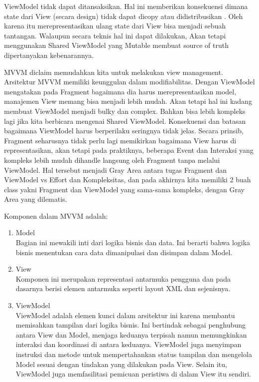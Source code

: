 \documentclass[conference]{IEEEtran}
\begin{document}
\indent ViewModel tidak dapat ditansaksikan. Hal ini memberikan konsekuensi dimana state dari View (secara design) tidak dapat dicopy atau didistribusikan \cite{saputro2020implementasi}. Oleh karena itu merepresentasikan ulang state dari View bisa menjadi sebuah tantangan. Walaupun secara teknis hal ini dapat dilakukan, Akan tetapi menggunakan Shared ViewModel yang Mutable membuat source of truth dipertanyakan kebenarannya.

\indent MVVM diclaim memudahkan kita untuk melakukan view management. Arsitektur MVVM memiliki keunggulan dalam modifiabilitas\cite{anhar2024analisis}. Dengan ViewModel mengatakan pada Fragment bagaimana dia harus merepresentasikan model, manajemen View memang bisa menjadi lebih mudah. Akan tetapi hal ini kadang membuat ViewModel menjadi bulky dan complex. Bahkan bisa lebih kompleks lagi jika kita berbicara mengenai Shared ViewModel. Konsekuensi dan batasan bagaimana ViewModel harus berperilaku seringnya tidak jelas. Secara prinsib, Fragment seharusnya tidak perlu lagi memikirkan bagaimana View harus di representasikan, akan tetapi pada praktiknya, beberapa Event dan Interaksi yang kompleks lebih mudah dihandle langsung oleh Fragment tanpa melalui ViewModel. Hal tersebut menjadi Gray Area antara tugas Fragment dan ViewModel vs Effort dan Kompleksitas, dan pada akhirnya kita memiliki 2 buah class yakni Fragment dan ViewModel yang sama-sama kompleks, dengan Gray Area yang dilematis. 

Komponen dalam MVVM adalah:
\begin{enumerate}
  \item Model \\
  Bagian ini mewakili inti dari logika bisnis dan data. Ini berarti bahwa logika bisnis menentukan cara data dimanipulasi dan disimpan dalam Model\cite{rasyid2022sistem}.
  
  \item View \\
  Komponen ini merupakan representasi antarmuka pengguna dan pada dasarnya berisi elemen antarmuka seperti layout XML dan sejenisnya\cite{rasyid2022sistem}.
  
  \item ViewModel \\
  ViewModel adalah elemen kunci dalam arsitektur ini karena membantu memisahkan tampilan dari logika bisnis. Ini bertindak sebagai penghubung antara View dan Model, menjaga keduanya terpisah namun memungkinkan interaksi dan koordinasi di antara keduanya. ViewModel juga menyimpan instruksi dan metode untuk mempertahankan status tampilan dan mengelola Model sesuai dengan tindakan yang dilakukan pada View. Selain itu, ViewModel juga memfasilitasi pemicuan peristiwa di dalam View itu sendiri\cite{rasyid2022sistem}.
\end{enumerate}
\end{document}
